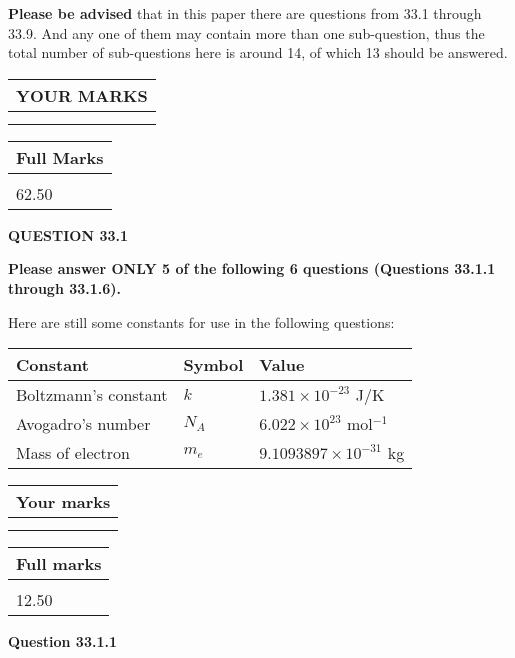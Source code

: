 \documentclass[12pt]{article}
\begin{document}
 
{\textbf{\large{Please be advised}}} that in this paper there are questions from
33.1 through
33.9.
And any one of them may contain more than one sub-question, thus the total number
of sub-questions here is around 14, of which
13 should be answered.
 
\vspace{0.3in}
 
 
   
   
  
\vspace{0.2in}
  
\noindent\begin{tabular}{|l|}
\hline
 YOUR MARKS  \\
\hline
 \\ 
 \\ 
\hline
\end{tabular}
\hspace{0.05in} \begin{tabular}{|l|}
\hline
 Full Marks  \\
\hline
 \\ 
62.50 \\
\hline
\end{tabular}
{\textbf{\Large{QUESTION
33.1 
}}}
  
  
 
{\textbf{\Large{Please answer ONLY
5 of the following
6 questions (Questions
33.1.1 through
33.1.6). }}}
 
Here are still some constants for use in the following questions:
 
 
\noindent\begin{tabular}{|l|l|l|}
\hline
Constant & Symbol & Value \\
\hline
 
Boltzmann's constant &
$k$ &
 $ 1.381 \times 10^{-23} $
J/K \\
\hline
 
Avogadro's number &
$N_A$ &
 $ 6.022 \times 10^{23} $
mol$^{-1}$ \\
\hline
 
Mass of electron &
$m_e$ &
 $ 9.1093897 \times 10^{-31} $
kg \\
\hline
 
\end{tabular}
 
  
\vspace{0.2in}
  
         \begin{tabular}{|l|}
\hline
 Your marks  \\
\hline
 \\ 
 \\ 
\hline
\end{tabular}
\hspace{0.05in} \begin{tabular}{|l|}
\hline
 Full marks  \\
\hline
 \\ 
12.50 \\
\hline
\end{tabular}
{\textbf{\Large{Question
33.1.1 
}}}
  
\end{document}
